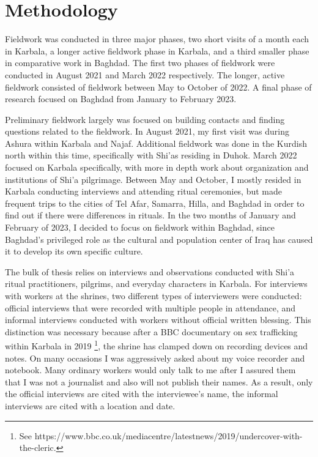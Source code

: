 \section{Methodology}
Fieldwork was conducted in three major phases, two short visits of a month each in Karbala, a longer active fieldwork phase in Karbala, and a third smaller phase in comparative work in Baghdad. The first two phases of fieldwork were conducted in August 2021 and March 2022 respectively. The longer, active fieldwork consisted of fieldwork between May to October of 2022. A final phase of research focused on Baghdad from January to February 2023. 

Preliminary fieldwork largely was focused on building contacts and finding questions related to the fieldwork. In August 2021, my first visit was during Ashura within Karbala and Najaf. Additional fieldwork was done in the Kurdish north within this time, specifically with Shi'as residing in Duhok. March 2022 focused on Karbala specifically, with more in depth work about organization and institutions of Shi'a pilgrimage. Between May and October, I mostly resided in Karbala conducting interviews and attending ritual ceremonies, but made frequent trips to the cities of Tel Afar, Samarra, Hilla, and Baghdad in order to find out if there were differences in rituals. In the two months of January and February of 2023, I decided to focus on fieldwork within Baghdad, since Baghdad's privileged role as the cultural and population center of Iraq has caused it to develop its own specific culture. 

The bulk of thesis relies on interviews and observations conducted with Shi'a ritual practitioners, pilgrims, and everyday characters in Karbala. For interviews with workers at the shrines, two different types of interviewers were conducted: official interviews that were recorded with multiple people in attendance, and informal interviews conducted with workers without official written blessing. This distinction was necessary because after a BBC documentary on sex trafficking within Karbala in 2019 \footnote{See https://www.bbc.co.uk/mediacentre/latestnews/2019/undercover-with-the-cleric.}, the shrine has clamped down on recording devices and notes. On many occasions I was aggressively asked about my voice recorder and notebook. Many ordinary workers would only talk to me after I assured them that I was not a journalist and also will not publish their names. As a result, only the official interviews are cited with the interviewee's name, the informal interviews are cited with a location and date. 


